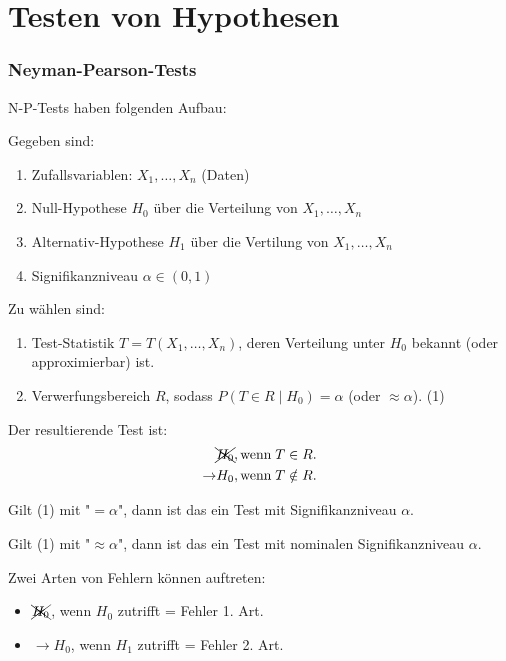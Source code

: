 \documentclass[10pt]{article}
\newcommand{\FZV}{X_1, \ldots, X_n} %
\begin{document}
	
	\pagebreak
	\part{Testen von Hypothesen}
	
	\section{Neyman-Pearson-Tests}
	
	N-P-Tests haben folgenden Aufbau:
	
	Gegeben sind:
	\begin{enumerate}
		\item Zufallsvariablen: $\FZV$ (Daten)
		\item Null-Hypothese $H_0$ über die Verteilung von $\FZV$
		\item Alternativ-Hypothese $H_1$ über die Vertilung von $\FZV$
		\item Signifikanzniveau $\alpha \in (0,1)$
	\end{enumerate}
	Zu wählen sind:
	\begin{enumerate}
		\item Test-Statistik $T = T(\FZV)$, deren Verteilung unter $H_0$ bekannt (oder approximierbar) ist. 
		\item Verwerfungsbereich $R$, sodass $P(T \in R \mid H_0) = \alpha$ (oder $\approx \alpha$). (1)
	\end{enumerate}
	
	Der resultierende Test ist: 
	\begin{equation*}
		\begin{split}
			&\xcancel{H_0}, \text{wenn} \; T \in R.\\
			\rightarrow &H_0, \text{wenn} \; T \notin R.
		\end{split}
	\end{equation*}
	
	Gilt (1) mit "$= \alpha$", dann ist das ein Test mit Signifikanzniveau $\alpha$. 
	
	Gilt (1) mit "$\approx \alpha$", dann ist das ein Test mit nominalen Signifikanzniveau $\alpha$. 
	
	Zwei Arten von Fehlern können auftreten:
	\begin{itemize}
		\item  $\xcancel{H_0}$, wenn $H_0$ zutrifft = Fehler 1. Art.\\
		\item $\rightarrow H_0$, wenn $H_1$ zutrifft = Fehler 2. Art.
	\end{itemize}
\end{document}
